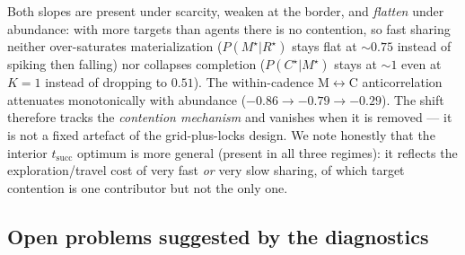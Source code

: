 \documentclass{article}
\begin{document}
Both slopes are present under scarcity, weaken at the border, and \emph{flatten}
under abundance: with more targets than agents there is no contention, so fast
sharing neither over-saturates materialization ($P(M^\star|R^\star)$ stays flat
at $\sim0.75$ instead of spiking then falling) nor collapses completion
($P(C^\star|M^\star)$ stays at $\sim1$ even at $K{=}1$ instead of dropping to
$0.51$). The within-cadence M$\leftrightarrow$C anticorrelation attenuates
monotonically with abundance ($-0.86\to-0.79\to-0.29$). The shift therefore
tracks the \emph{contention mechanism} and vanishes when it is removed --- it is
not a fixed artefact of the grid-plus-locks design. We note honestly that the
interior $t_{\mathrm{succ}}$ optimum is more general (present in all three
regimes): it reflects the exploration/travel cost of very fast \emph{or} very
slow sharing, of which target contention is one contributor but not the only
one.

\subsection{Open problems suggested by the diagnostics}
\label{app:open-problems}
\end{document}
